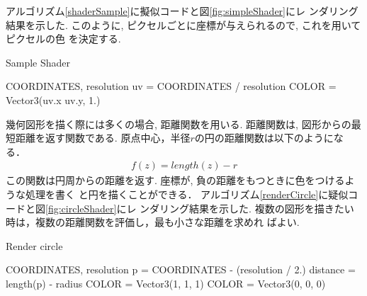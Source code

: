 アルゴリズム\ref{shaderSample}に擬似コードと図\ref{fig:simpleShader}にレ
ンダリング結果を示した.
このように, ピクセルごとに座標が与えられるので, これを用いてピクセルの色
を決定する.

\begin{algorithm}
 \begin{algorithmic}
  \begin{minipage}{0.5\hsize}
   \caption{Sample Shader}
   \label{shaderSample}
   \REQUIRE COORDINATES, resolution
   \STATE uv = COORDINATES / resolution
   \STATE COLOR = Vector3(uv.x uv.y, 1.)
  \end{minipage}
 \end{algorithmic}
\end{algorithm}

幾何図形を描く際には多くの場合, 距離関数を用いる.
距離関数は, 図形からの最短距離を返す関数である.
原点中心，半径$r$の円の距離関数は以下のようになる．
\begin{align*}
 f(z) =  length(z) - r
\end{align*}
この関数は円周からの距離を返す.
座標が, 負の距離をもつときに色をつけるような処理を書く
と円を描くことができる．
アルゴリズム\ref{renderCircle}に疑似コードと図\ref{fig:circleShader}にレ
ンダリング結果を示した.
複数の図形を描きたい時は，複数の距離関数を評価し，最も小さな距離を求めれ
ばよい.

\begin{algorithm}
 \begin{algorithmic}
  \caption{Render circle}
  \label{renderCircle}
  \REQUIRE COORDINATES, resolution
  \STATE p = COORDINATES - (resolution / 2.)
  \STATE distance = length(p) - radius
  \STATE COLOR = Vector3(1, 1, 1)
  \ELSE
  \STATE COLOR = Vector3(0, 0, 0)
  \ENDIF
 \end{algorithmic}
\end{algorithm}

